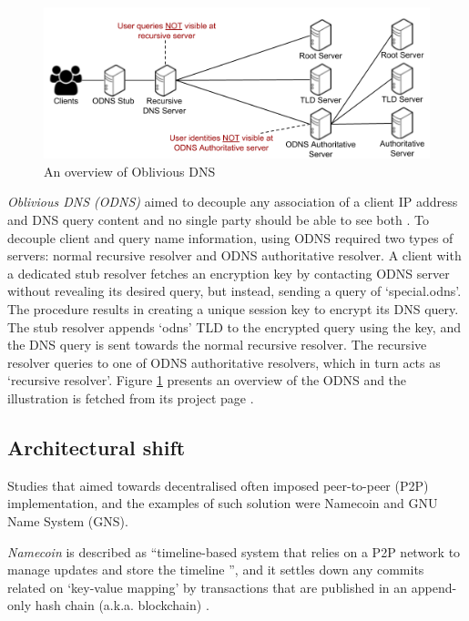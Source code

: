 \begin{figure}[h!]
    \begin{center}
    \includegraphics*[width=0.9\columnwidth]{img/ODNSoverview}
    \end{center}
    \caption{An overview of Oblivious DNS \cite{ODNSwebsite}}
    \label{odnsoverview}
\end{figure}
\textit{Oblivious DNS (ODNS)} aimed to decouple any association of a client IP address and DNS query content and no single party should be able to see both \cite{annee-dprive-oblivious-dns-00}.
To decouple client and query name information, using ODNS required two types of servers: normal recursive resolver and ODNS authoritative resolver.
A client with a dedicated stub resolver fetches an encryption key by contacting ODNS server without revealing its desired query, but instead, sending a query of `special.odns'.
The procedure results in creating a unique session key to encrypt its DNS query. The stub resolver appends `odns' TLD to the encrypted query using the key, and the DNS query is sent towards the normal recursive resolver. The recursive resolver queries to one of ODNS authoritative resolvers, which in turn acts as `recursive resolver'.
Figure \ref{odnsoverview} presents an overview of the ODNS and the illustration is fetched from its project page \cite{ODNSwebsite}.

\subsection{Architectural shift}
Studies that aimed towards decentralised often imposed peer-to-peer (P2P) implementation, and the examples of such solution were Namecoin and GNU Name System (GNS).

\textit{Namecoin} \cite{loibl2014namecoin} is described as ``timeline-based system that relies on a P2P network to manage updates and store the timeline \cite{grothoff2017nsa}'', and it settles down any commits related on `key-value mapping' by transactions that are published in an append-only hash chain (a.k.a. blockchain) \cite{kalodner2015empirical}.

